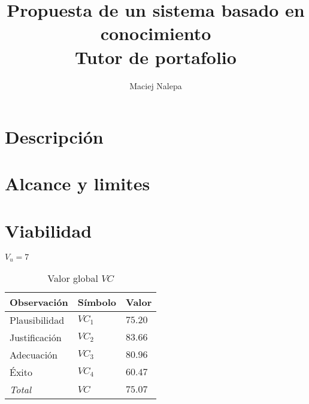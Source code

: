\documentclass[a4paper,12pt]{article}
\title{Propuesta de un sistema basado en conocimiento\\ \normalsize{Tutor de portafolio}}
\author{Maciej Nalepa}
\begin{document}
\maketitle

\section{Descripción}

\section{Alcance y limites}

\section{Viabilidad}

$V_u = 7$

\begin{table}[h]
	\centering
	\begin{tabular}{|l|l|l|}
		\hline
		Observación    & Símbolo & Valor \\ \hline
		Plausibilidad  & $VC_1$  & $75.20$   \\
		Justificación  & $VC_2$  & $83.66$   \\
		Adecuación     & $VC_3$  & $80.96$   \\
		Éxito          & $VC_4$  & $60.47$   \\ \hline
		\textit{Total} & $VC$    & $75.07$   \\ \hline
	\end{tabular}
	\caption{Valor global $VC$}
	\label{tab:total}
\end{table}
\end{document}
